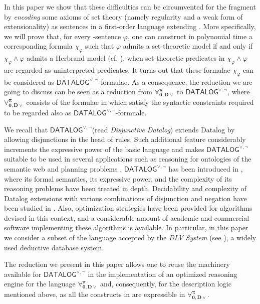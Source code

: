 \documentclass[a4paper]{llncs}
\newcommand{\DisjDatalog}{\ensuremath{\mathsf{DATALOG}^{\vee,\neg}}\xspace}
\newcommand{\ForallpizeroDisjDatalog}{\ensuremath{\mathbf{\forall_{0,D\vee}^{\pi}}}\xspace}
\begin{document}
In this paper we show that these difficulties can be circumvented for
the fragment \Forallpizero by \emph{encoding} some axioms of set
theory (namely regularity and a weak form of extensionality) as
sentences in a first-order language extending \Forallpizero.
More specifically, we will prove that, for
every \Forallpizero-sentence $\varphi$, one can construct in polynomial
time a corresponding formula $\chi_{\varphi}$ such that
$\varphi$ admits a set-theoretic model if and only if
$\chi_{\varphi} \wedge \varphi$ admits a Herbrand model (cf.
\cite{Her2002}), when set-theoretic predicates in $\chi_{\varphi}
\wedge \varphi$ are regarded as uninterpreted predicates.
%
It turns out that these formulae $\chi_{\varphi}$ can be considered
as \DisjDatalog-formulae. As a consequence, the reduction we
are going to discuss can be seen as a reduction from
\ForallpizeroDisjDatalog to \DisjDatalog, where
$\ForallpizeroDisjDatalog$
consists of the formulae in \Forallpizero which satisfy
the syntactic constraints required to be regarded also as 
\DisjDatalog-formuale.

We recall that \DisjDatalog (read \emph{Disjunctive Datalog})
extends Datalog by allowing disjunctions in the
head of rules. Such additional feature considerably increments the expressive power of the basic language and makes \DisjDatalog suitable to be used in several applications such as reasoning for ontologies of the semantic web \cite{hustadt2007reasoning} and planning problems \cite{Eiter:2004}. 
\DisjDatalog has been introduced in \cite{EitGotMan1997}, where its formal semantics, its expressive power, and the complexity of its reasoning problems have been treated in depth. Decidability and complexity of Datalog
extensions with various combinations of disjunction and negation have
been studied in \cite{AlvianoFLM12,GottlobMMP12}.
Also, optimization strategies have been provided for
algorithms devised in this context, and a considerable amount of
academic and commercial software implementing these algorithms is
available. In particular, in this paper we consider a subset of the language
accepted by the \emph{DLV System} (see \cite{AlvFabLeoPerPfeTer2011,LeoPfeFabEitGotPerSca2006}), 
a widely used deductive database system.

The reduction we present in this paper
allows one to reuse the machinery available for \DisjDatalog in the implementation of an optimized
reasoning engine for the language \ForallpizeroDisjDatalog and,
consequently, for the description logic \dlForallpizero mentioned
above, as all the constructs in \dlForallpizero are expressible in
\ForallpizeroDisjDatalog.
\end{document}
